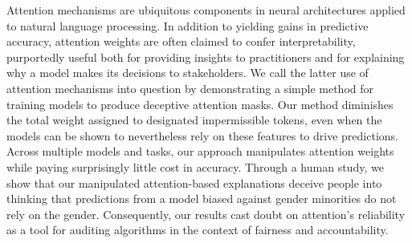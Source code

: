 Attention mechanisms are ubiquitous components in neural architectures applied to natural language processing. In addition to yielding gains in predictive accuracy, attention weights are often claimed to confer interpretability, purportedly useful both for providing insights to practitioners and for explaining why a model makes its decisions to stakeholders. We call the latter use of attention mechanisms into question by demonstrating a simple method for training models to produce deceptive attention masks. Our method diminishes the total weight assigned to designated impermissible tokens, even when the models can be shown to nevertheless rely on these features to drive predictions. Across multiple models and tasks, our approach manipulates attention weights while paying surprisingly little cost in accuracy. Through a human study, we show that our manipulated attention-based explanations deceive people into thinking that predictions from a model biased against gender minorities do not rely on the gender.  Consequently, our results cast doubt on attention's reliability as a tool for auditing algorithms in the context of fairness and accountability.
